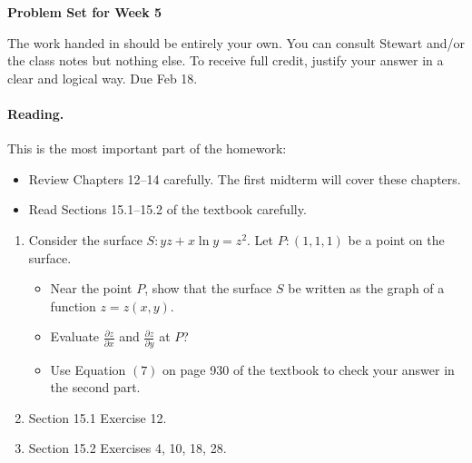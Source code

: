 \documentclass[11pt]{article}
\theoremstyle{plain}
\theoremstyle{definition}
\begin{document}
\begin{center}
{\Large \bf Problem Set for Week 5}
\end{center}
The work handed in should be entirely your own. You can consult Stewart and/or the class notes but nothing else. To receive full credit, justify your answer in a clear and logical way. Due Feb 18.

\paragraph{Reading.} This is the most important part of the homework:
\begin{itemize}
\item Review Chapters 12--14 carefully. The first midterm will cover these chapters.
\item Read Sections 15.1--15.2 of the textbook carefully.
\end{itemize}

\begin{enumerate}
\item Consider the surface $S:yz+x\ln y=z^2$. Let $P:(1,1,1)$ be a point on the surface. 
\begin{itemize}
\item Near the point $P$, show that the surface $S$ be written as the graph of a function $z=z(x,y)$.
\item Evaluate $\frac{\partial z}{\partial x}$ and $\frac{\partial z}{\partial y}$ at $P$?
\item Use Equation $(7)$ on page 930 of the textbook to check your answer in the second part.
\end{itemize}  
\item Section 15.1 Exercise 12.
\item Section 15.2 Exercises 4, 10, 18, 28.
\end{enumerate}
\end{document}
